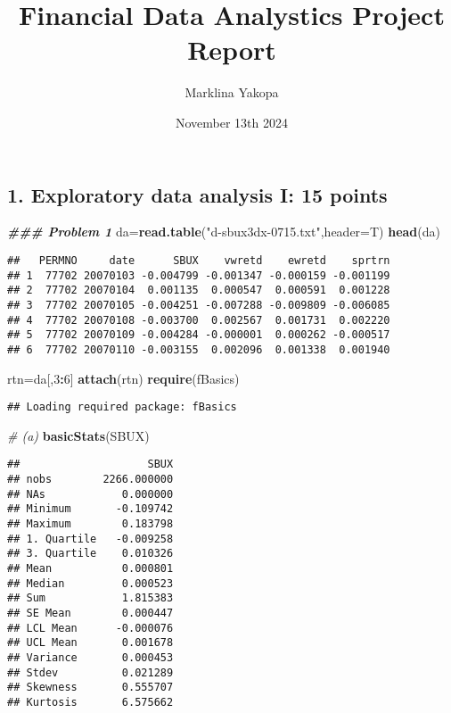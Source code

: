 \documentclass[
]{article}
\title{Financial Data Analystics Project Report}
\author{Marklina Yakopa}
\date{November 13th 2024}
\newenvironment{Shaded}{\begin{snugshade}}{\end{snugshade}}
\newcommand{\AttributeTok}[1]{\textcolor[rgb]{0.13,0.29,0.53}{#1}}
\newcommand{\CommentTok}[1]{\textcolor[rgb]{0.56,0.35,0.01}{\textit{#1}}}
\newcommand{\DecValTok}[1]{\textcolor[rgb]{0.00,0.00,0.81}{#1}}
\newcommand{\DocumentationTok}[1]{\textcolor[rgb]{0.56,0.35,0.01}{\textbf{\textit{#1}}}}
\newcommand{\FunctionTok}[1]{\textcolor[rgb]{0.13,0.29,0.53}{\textbf{#1}}}
\newcommand{\NormalTok}[1]{#1}
\newcommand{\OtherTok}[1]{\textcolor[rgb]{0.56,0.35,0.01}{#1}}
\newcommand{\SpecialCharTok}[1]{\textcolor[rgb]{0.81,0.36,0.00}{\textbf{#1}}}
\newcommand{\StringTok}[1]{\textcolor[rgb]{0.31,0.60,0.02}{#1}}
\begin{document}
\maketitle

\subsection{1. Exploratory data analysis I: 15
points}\label{exploratory-data-analysis-i-15-points}

\begin{Shaded}
\begin{Highlighting}[]
\DocumentationTok{\#\#\# Problem 1}
\NormalTok{da}\OtherTok{=}\FunctionTok{read.table}\NormalTok{(}\StringTok{"d{-}sbux3dx{-}0715.txt"}\NormalTok{,}\AttributeTok{header=}\NormalTok{T)}
\FunctionTok{head}\NormalTok{(da)}
\end{Highlighting}
\end{Shaded}

\begin{verbatim}
##   PERMNO     date      SBUX    vwretd    ewretd    sprtrn
## 1  77702 20070103 -0.004799 -0.001347 -0.000159 -0.001199
## 2  77702 20070104  0.001135  0.000547  0.000591  0.001228
## 3  77702 20070105 -0.004251 -0.007288 -0.009809 -0.006085
## 4  77702 20070108 -0.003700  0.002567  0.001731  0.002220
## 5  77702 20070109 -0.004284 -0.000001  0.000262 -0.000517
## 6  77702 20070110 -0.003155  0.002096  0.001338  0.001940
\end{verbatim}

\begin{Shaded}
\begin{Highlighting}[]
\NormalTok{rtn}\OtherTok{=}\NormalTok{da[,}\DecValTok{3}\SpecialCharTok{:}\DecValTok{6}\NormalTok{]}
\FunctionTok{attach}\NormalTok{(rtn)}
\FunctionTok{require}\NormalTok{(fBasics)}
\end{Highlighting}
\end{Shaded}

\begin{verbatim}
## Loading required package: fBasics
\end{verbatim}

\begin{Shaded}
\begin{Highlighting}[]
\CommentTok{\# (a)}
\FunctionTok{basicStats}\NormalTok{(SBUX)}
\end{Highlighting}
\end{Shaded}

\begin{verbatim}
##                    SBUX
## nobs        2266.000000
## NAs            0.000000
## Minimum       -0.109742
## Maximum        0.183798
## 1. Quartile   -0.009258
## 3. Quartile    0.010326
## Mean           0.000801
## Median         0.000523
## Sum            1.815383
## SE Mean        0.000447
## LCL Mean      -0.000076
## UCL Mean       0.001678
## Variance       0.000453
## Stdev          0.021289
## Skewness       0.555707
## Kurtosis       6.575662
\end{verbatim}
\end{document}
